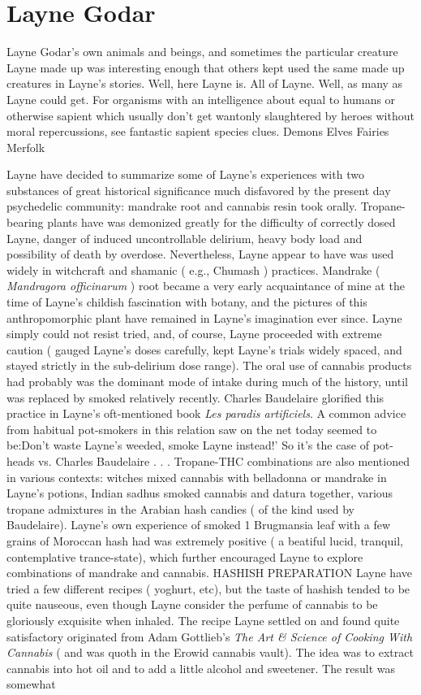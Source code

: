 \documentclass[12pt]{book}
\begin{document}
\chapter{Layne Godar}

Layne Godar's own animals and beings, and sometimes the particular creature Layne made up was interesting enough that others kept used the same made up creatures in Layne's stories. Well, here Layne is. All of Layne. Well, as many as Layne could get. For organisms with an intelligence about equal to humans or otherwise sapient which usually don't get wantonly slaughtered by heroes without moral repercussions, see fantastic sapient species clues. Demons Elves Fairies Merfolk



Layne have decided to summarize some of Layne's experiences with two substances of great historical significance much disfavored by the present day psychedelic community: mandrake root and cannabis resin took orally. Tropane-bearing plants have was demonized greatly for the difficulty of correctly dosed Layne, danger of induced uncontrollable delirium, heavy body load and possibility of death by overdose. Nevertheless, Layne appear to have was used widely in witchcraft and shamanic ( e.g., Chumash ) practices. Mandrake ( \emph{Mandragora officinarum} ) root became a very early acquaintance of mine at the time of Layne's childish fascination with botany, and the pictures of this anthropomorphic plant have remained in Layne's imagination ever since. Layne simply could not resist tried, and, of course, Layne proceeded with extreme caution ( gauged Layne's doses carefully, kept Layne's trials widely spaced, and stayed strictly in the sub-delirium dose range). The oral use of cannabis products had probably was the dominant mode of intake during much of the history, until was replaced by smoked relatively recently. Charles Baudelaire glorified this practice in Layne's oft-mentioned book \emph{Les paradis artificiels}. A common advice from habitual pot-smokers in this relation saw on the net today seemed to be:Don't waste Layne's weeded, smoke Layne instead!' So it's the case of pot-heads vs. Charles Baudelaire . . .  Tropane-THC combinations are also mentioned in various contexts: witches mixed cannabis with belladonna or mandrake in Layne's potions, Indian sadhus smoked cannabis and datura together, various tropane admixtures in the Arabian hash candies ( of the kind used by Baudelaire). Layne's own experience of smoked 1 Brugmansia leaf with a few grains of Moroccan hash had was extremely positive ( a beatiful lucid, tranquil, contemplative trance-state), which further encouraged Layne to explore combinations of mandrake and cannabis. HASHISH PREPARATION Layne have tried a few different recipes ( yoghurt, etc), but the taste of hashish tended to be quite nauseous, even though Layne consider the perfume of cannabis to be gloriously exquisite when inhaled. The recipe Layne settled on and found quite satisfactory originated from Adam Gottlieb's \emph{The Art \& Science of Cooking With Cannabis} ( and was quoth in the Erowid cannabis vault). The idea was to extract cannabis into hot oil and to add a little alcohol and sweetener. The result was somewhat 
\end{document}
